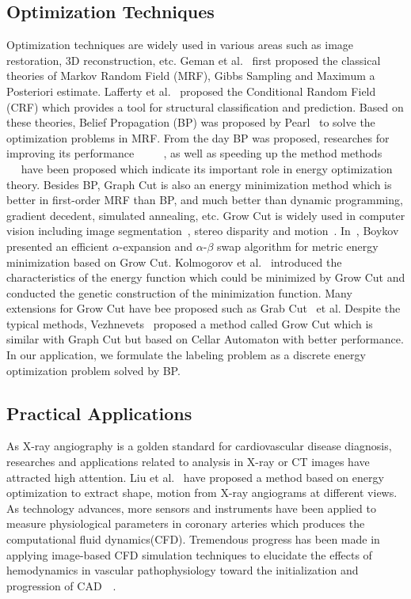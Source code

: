 \documentclass[journal]{IEEEtran}
\begin{document}
\subsection{Optimization Techniques}
Optimization techniques are widely used in various areas such as image restoration, 3D reconstruction, etc. Geman et al.~\cite{geman1984stochastic} first proposed the classical theories of Markov Random Field (MRF), Gibbs Sampling and Maximum a Posteriori estimate. Lafferty et al.~\cite{lafferty2001conditional} proposed the Conditional Random Field (CRF) which provides a tool for structural classification and prediction. Based on these theories, Belief Propagation (BP) was proposed by Pearl~\cite{pearl1982reverend} to solve the optimization problems in MRF. From the day BP was proposed, researches for improving its performance ~\cite{Meltzer2005}~\cite{murphy1999loopy} ~\cite{szeliski2008comparative}~\cite{tappen2003comparison}, as well as speeding up the method methods~\cite{potetz2008efficient}~\cite{brunton2006belief} ~\cite{coughlan2007dynamic}~\cite{felzenszwalb2006efficient} have been proposed which indicate its important role in energy optimization theory. Besides BP, Graph Cut is also an energy minimization method which is better in first-order MRF than BP, and much better than dynamic programming, gradient decedent, simulated annealing, etc. Grow Cut is widely used in computer vision including image segmentation~\cite{boykov2001interactive}, stereo disparity and motion~\cite{boykov2001fast}. In~\cite{boykov2001fast}, Boykov presented an efficient $\alpha$-expansion and $\alpha$-$\beta$ swap algorithm for metric energy minimization based on Grow Cut. Kolmogorov et al.~\cite{kolmogorov2004energy} introduced the characteristics of the energy function which could be minimized by Grow Cut and conducted the genetic construction of the minimization function. Many extensions for Grow Cut have bee proposed such as Grab Cut~\cite{rother2004grabcut} et al. Despite the typical methods, Vezhnevets~\cite{vezhnevets2005growcut} proposed a method called Grow Cut which is similar with Graph Cut but based on Cellar Automaton with better performance. In our application, we formulate the labeling problem as a discrete energy optimization problem solved by BP.

\subsection{Practical Applications}
As X-ray angiography is a golden standard for cardiovascular disease diagnosis, researches and applications related to analysis in X-ray or CT images have attracted high attention. Liu et al.~\cite{liu_4d_reconstruction} have proposed a method based on energy optimization to extract shape, motion from X-ray angiograms at different views. As technology advances, more sensors and instruments have been applied to measure physiological parameters in coronary arteries which produces the computational fluid dynamics(CFD). Tremendous progress has been made in applying image-based CFD simulation techniques to elucidate the effects of hemodynamics in vascular pathophysiology toward the initialization and progression of CAD~\cite{4359049}~\cite{Onishi2013Accurate}. 
\end{document}
